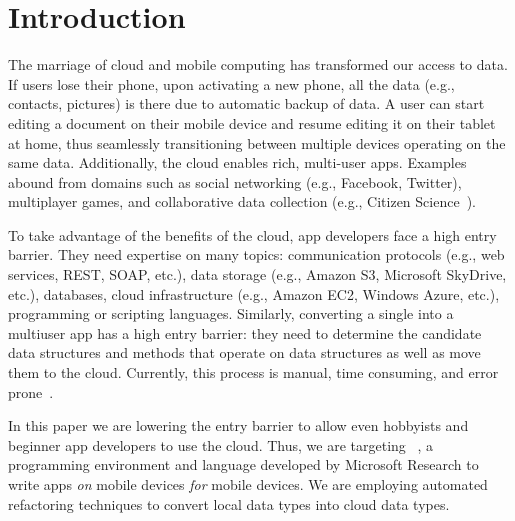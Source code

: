\documentclass[preprint]{sigplanconf}
\begin{document}
\section{Introduction}


The marriage of cloud and mobile computing has transformed our access to data. 
If users lose their phone, upon activating a new phone, all the data (e.g., contacts, pictures) is there due to automatic backup of data.
A user can start editing a document on their mobile device and resume editing it on their tablet at home, thus seamlessly transitioning between multiple devices operating on the same data. Additionally, the cloud enables rich, multi-user apps. Examples abound from domains such as social networking (e.g., Facebook, Twitter), multiplayer games, and collaborative data collection (e.g., Citizen Science~\cite{cohn2008citizen}). 

To take advantage of the benefits of the cloud, app developers face a high entry barrier. They need expertise on many topics: communication protocols (e.g., web services, REST, SOAP, etc.), data storage (e.g., Amazon S3, Microsoft SkyDrive, etc.), databases, cloud infrastructure (e.g., Amazon EC2, Windows Azure, etc.),  programming or scripting languages. Similarly, converting a single into a multiuser app has a high entry barrier: they need to determine the candidate data structures and methods that operate on data structures as well as move them to the cloud. Currently, this process is manual, time consuming, and error prone~\cite{khan2013survey}.

In this paper we are lowering the entry barrier to allow even hobbyists and beginner app developers to use the cloud. Thus, we are targeting \TD~\cite{Tillmann2011TPC20482372048245}, a programming environment and language developed by Microsoft Research to write apps \emph{on} mobile devices \emph{for} mobile devices. We are employing automated refactoring techniques to convert local data types into cloud data types.
\end{document}
